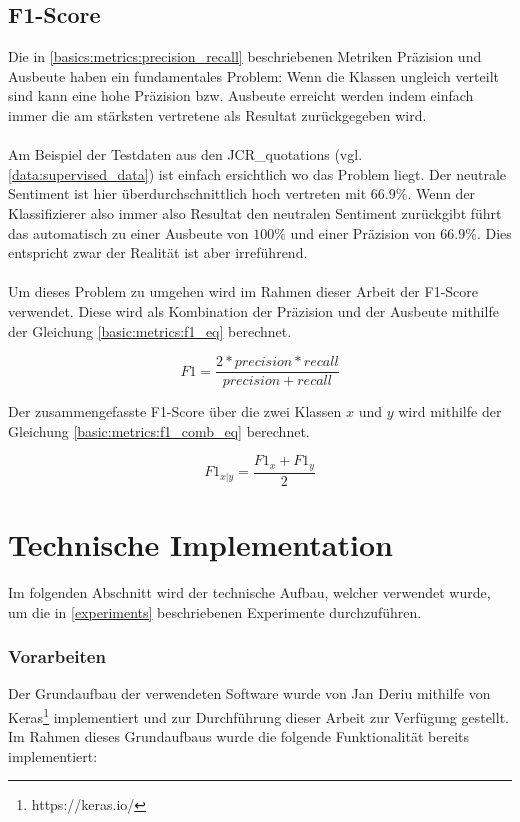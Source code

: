\subsection{F1-Score}
Die in \ref{basics:metrics:precision_recall} beschriebenen Metriken Präzision und Ausbeute haben ein fundamentales Problem: Wenn die Klassen ungleich verteilt sind kann eine hohe Präzision bzw. Ausbeute erreicht werden indem einfach immer die am stärksten vertretene als Resultat zurückgegeben wird.\\\\Am Beispiel der Testdaten aus den JCR{\_}quotations (vgl. \ref{data:supervised_data}) ist einfach ersichtlich wo das Problem liegt. Der neutrale Sentiment ist hier überdurchschnittlich hoch vertreten mit $66.9\%$. Wenn der Klassifizierer also immer also Resultat den neutralen Sentiment zurückgibt führt das automatisch zu einer Ausbeute von $100\%$ und einer Präzision von $66.9\%$. Dies entspricht zwar der Realität ist aber irreführend.\\\\
Um dieses Problem zu umgehen wird im Rahmen dieser Arbeit der F1-Score verwendet. Diese wird als Kombination der Präzision und der Ausbeute mithilfe der Gleichung \ref{basic:metrics:f1_eq} berechnet.

\begin{equation}
\label{basic:metrics:f1_eq}
F1 = \frac{2*precision*recall}{precision + recall}
\end{equation}

Der zusammengefasste F1-Score über die zwei Klassen $x$ und $y$ wird mithilfe der Gleichung \ref{basic:metrics:f1_comb_eq} berechnet.

\begin{equation}
\label{basic:metrics:f1_comb_eq}
F1_{x|y} = \frac{F1_x + F1_y}{2}
\end{equation}

\section{Technische Implementation}
Im folgenden Abschnitt wird der technische Aufbau, welcher verwendet wurde, um die in \ref{experiments} beschriebenen Experimente durchzuführen.

\subsubsection{Vorarbeiten}
\label{technichal_setup:prework}
Der Grundaufbau der verwendeten Software wurde von Jan Deriu mithilfe von Keras\footnote{https://keras.io/} implementiert und zur Durchführung dieser Arbeit zur Verfügung gestellt. Im Rahmen dieses Grundaufbaus wurde die folgende Funktionalität bereits implementiert:

